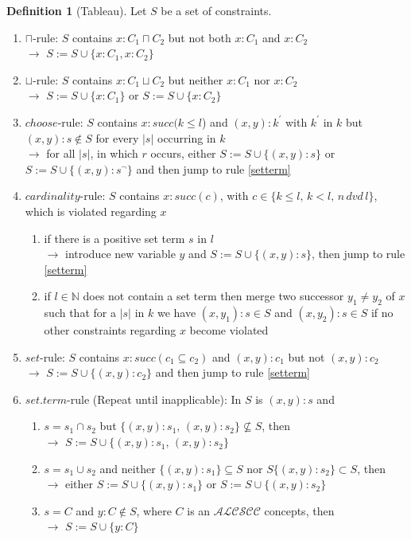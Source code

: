 \documentclass[a4paper,11pt]{scrartcl}
\theoremstyle{break}
\theoremstyle{definition}
\newtheorem{mydef}{Definition}
\begin{document}
\begin{mydef}[Tableau]
Let $S$ be a set of constraints. 
\begin{enumerate}
\item\label{cap} $\sqcap$-rule: $S$ contains $x:C_1\sqcap C_2$ but not both $x:C_1$ and $x:C_2$\\
$\rightarrow$ $S:=S\cup\{x:C_1, x:C_2\}$
\item\label{cup} $\sqcup$-rule: $S$ contains $x:C_1\sqcup C_2$ but neither $x:C_1$ nor $x:C_2$\\
$\rightarrow$ $S:=S\cup\{x:C_1\}$ or $S:=S\cup\{x:C_2\}$
\item\label{choose}$choose$-rule: $S$ contains
$x:succ(k\leq l$) and $(x,y):k^\prime$ with $k^\prime$ in $k$ but $(x,y):s\not\in S$ for every $|s|$ occurring in $k$\\
$\rightarrow$ for all $|s|$, in which $r$ occurs, either $S:=S\cup\{(x,y):s\}$ or $S:=S\cup\{(x,y):s^\neg\}$ and then jump to rule \ref{setterm}
\item\label{c}$cardinality$-rule: $S$ contains $x:succ(c)$, with $c\in\{k\leq l,\,k<l,\, n\, dvd\,l\}$, which is violated regarding $x$
\begin{enumerate}
\item \label{setterm} if there is a positive set term $s$ in $l$\\
$\rightarrow$ introduce new variable $y$ and $S:=S\cup\{(x,y):s\}$, then jump to rule \ref{setterm}
\item \label{exceeded} if $l\in \mathbb{N}$ does not contain a set term then merge two successor $y_1\neq y_2$ of $x$ such that for a $|s|$ in $k$ we have $(x,y_1):s\in S$ and $(x,y_2):s\in S$ if no other constraints regarding $x$ become violated
\end{enumerate}
\item\label{s}$set$-rule: $S$ contains $x:succ(c_1\subseteq c_2)$ and $(x,y):c_1$ but not $(x,y):c_2$\\
$\rightarrow$ $S:=S\cup\{(x,y):c_2\}$ and then jump to rule \ref{setterm}
\item\label{repeat} $set.term$-rule (Repeat until inapplicable): In $S$ is $(x,y):s$ and
\begin{enumerate}
\item\label{setterm1} $s=s_1\cap s_2$ but $\{(x,y):s_1,\,(x,y):s_2\}\not\subseteq S$, then\\
$\rightarrow$ $S:=S\cup \{(x,y):s_1,\,(x,y):s_2\}$ 
\item\label{setterm2} $s=s_1\cup s_2$ and neither $\{(x,y):s_1\}\subseteq S$ nor $S\{(x,y):s_2\}\subset S$, then\\
$\rightarrow$ either $S:=S\cup \{(x,y):s_1\}$ or $S:=S\cup \{(x,y):s_2\}$ 
\item\label{setterm3} $s=C$ and $y:C\notin S$, where $C$ is an $\mathcal{ALCSCC}$ concepts, then \\
$\rightarrow$ $S:=S\cup\{y:C\}$
\end{enumerate}
\end{enumerate}
\end{mydef}
\end{document}
